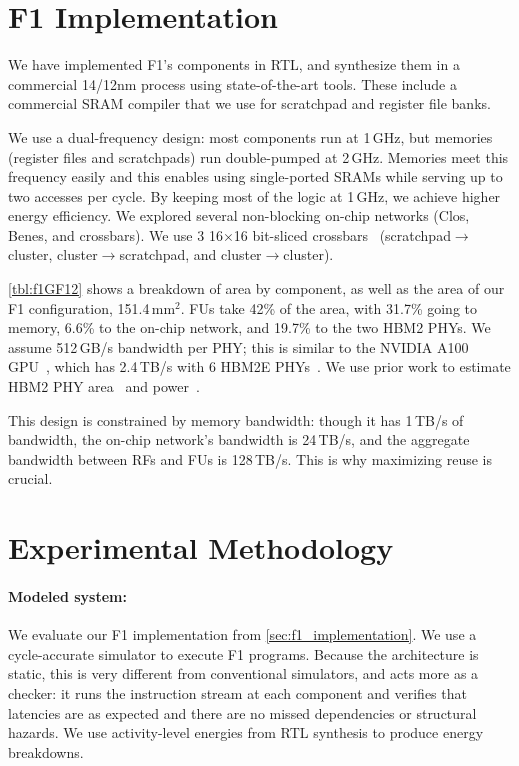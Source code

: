 \section{F1 Implementation}
\label{sec:f1_implementation}

We have implemented F1's components in RTL, and synthesize them in a commercial
14/12nm process using state-of-the-art tools. These include a commercial SRAM
compiler that we use for scratchpad and register file banks.

We use a dual-frequency design: most components run at 1\,GHz, but memories
(register files and scratchpads) run double-pumped at 2\,GHz. Memories meet
this frequency easily and this enables using single-ported SRAMs while serving
up to two accesses per cycle. By keeping most of the logic at 1\,GHz, we
achieve higher energy efficiency. We explored several non-blocking on-chip
networks (Clos, Benes, and crossbars). We use 3 16$\times$16 bit-sliced
crossbars~\cite{passas:tocaid12:crossbar} (scratch\-pad$\rightarrow$cluster,
cluster$\rightarrow$scratchpad, and cluster$\rightarrow$cluster).

\autoref{tbl:f1GF12} shows a breakdown of area by component, as well as the
area of our F1 configuration, 151.4\,mm$^2$. FUs take 42\% of the area, with
31.7\% going to memory, 6.6\% to the on-chip network, and 19.7\% to the two
HBM2 PHYs. We assume 512\,GB/s bandwidth per PHY; this is similar to the NVIDIA
A100 GPU~\cite{choquette2021nvidia}, which has 2.4\,TB/s with 6 HBM2E
PHYs~\cite{nvidiadgx}. We use prior work to estimate HBM2 PHY
area~\cite{rambuswhite, dasgupta20208} and power~\cite{rambuswhite,
ge2011design}.

This design is constrained by memory bandwidth: though it has 1\,TB/s of
bandwidth, the on-chip network's bandwidth is 24\,TB/s, and the aggregate
bandwidth between RFs and FUs is 128\,TB/s. This is why maximizing reuse is
crucial.

\section{Experimental Methodology}
\label{sec:f1_methodology}

\paragraph{Modeled system:}
We evaluate our F1 implementation from \autoref{sec:f1_implementation}. We use a
cycle-accurate simulator to execute F1 programs. Because the architecture is
static, this is very different from conventional simulators, and acts more as a
checker: it runs the instruction stream at each component and verifies that
latencies are as expected and there are no missed dependencies or structural
hazards. We use activity-level energies from RTL synthesis to produce energy
breakdowns.

